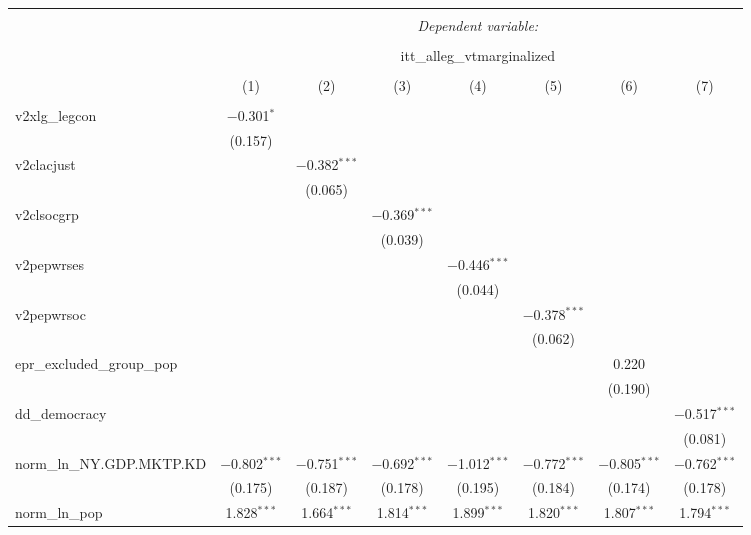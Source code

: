 
\begin{sidewaystable}[!htbp] \centering 
  \caption{} 
  \label{} 
\tiny 
\begin{tabular}{@{\extracolsep{5pt}}lccccccc} 
\\[-1.8ex]\hline 
\hline \\[-1.8ex] 
 & \multicolumn{7}{c}{\textit{Dependent variable:}} \\ 
\cline{2-8} 
\\[-1.8ex] & \multicolumn{7}{c}{itt\_alleg\_vtmarginalized} \\ 
\\[-1.8ex] & (1) & (2) & (3) & (4) & (5) & (6) & (7)\\ 
\hline \\[-1.8ex] 
 v2xlg\_legcon & $-$0.301$^{*}$ &  &  &  &  &  &  \\ 
  & (0.157) &  &  &  &  &  &  \\ 
  v2clacjust &  & $-$0.382$^{***}$ &  &  &  &  &  \\ 
  &  & (0.065) &  &  &  &  &  \\ 
  v2clsocgrp &  &  & $-$0.369$^{***}$ &  &  &  &  \\ 
  &  &  & (0.039) &  &  &  &  \\ 
  v2pepwrses &  &  &  & $-$0.446$^{***}$ &  &  &  \\ 
  &  &  &  & (0.044) &  &  &  \\ 
  v2pepwrsoc &  &  &  &  & $-$0.378$^{***}$ &  &  \\ 
  &  &  &  &  & (0.062) &  &  \\ 
  epr\_excluded\_group\_pop &  &  &  &  &  & 0.220 &  \\ 
  &  &  &  &  &  & (0.190) &  \\ 
  dd\_democracy &  &  &  &  &  &  & $-$0.517$^{***}$ \\ 
  &  &  &  &  &  &  & (0.081) \\ 
  norm\_ln\_NY.GDP.MKTP.KD & $-$0.802$^{***}$ & $-$0.751$^{***}$ & $-$0.692$^{***}$ & $-$1.012$^{***}$ & $-$0.772$^{***}$ & $-$0.805$^{***}$ & $-$0.762$^{***}$ \\ 
  & (0.175) & (0.187) & (0.178) & (0.195) & (0.184) & (0.174) & (0.178) \\ 
  norm\_ln\_pop & 1.828$^{***}$ & 1.664$^{***}$ & 1.814$^{***}$ & 1.899$^{***}$ & 1.820$^{***}$ & 1.807$^{***}$ & 1.794$^{***}$ \\ 

\end{tabular}
\end{sidewaystable}

